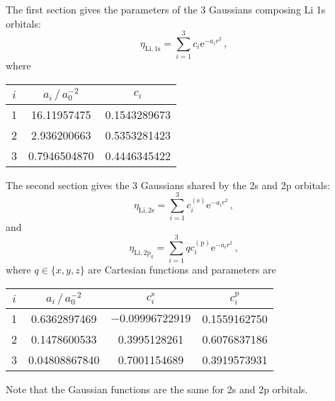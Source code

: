 \documentclass{article}
\theoremstyle{plain}\theoremheaderfont{\normalfont\itshape}\theorembodyfont{\rmfamily}\theoremseparator{.}\newtheorem*{rem}{Remark}\newtheorem*{ex}{Example}\newtheorem*{proof}{Proof}\newtheorem*{altp}{Alternative proof}
\theoremstyle{plain}\theoremheaderfont{\normalfont\bfseries}\theorembodyfont{\rmfamily}\theoremseparator{.}\newtheorem{thm}{Theorem}[section]\newtheorem{lem}[thm]{Lemma}\newtheorem{prop}[thm]{Proposition}\newtheorem*{cor}{Corollary}\newtheorem{defn}[thm]{Definition}\newtheorem{clm}[thm]{Claim}\newtheorem{clminproof}{Claim}
\theoremstyle{break}\theoremheaderfont{\normalfont\itshape}\theorembodyfont{\rmfamily}\theoremseparator{.\medskip}\newtheorem*{proofskip}{Proof}\newtheorem*{exs}{Examples}\newtheorem*{rems}{Remarks}
\theoremstyle{break}\theoremheaderfont{\normalfont\bfseries}\theorembodyfont{\rmfamily}\theoremseparator{.\medskip}\newtheorem{lemskip}[thm]{Lemma}\newtheorem{defnskip}[thm]{Definition}\newtheorem{propskip}[thm]{Proposition}\newtheorem{thmskip}[thm]{Theorem}
\numberwithin{equation}{section}
\newcommand{\e}{\mathrm{e}}
\begin{document}
\begin{itemize}[topsep=0pt,parsep=1em]
        The first section gives the parameters of the 3 Gaussians composing Li 1s orbitals:
        \begin{equation}
            \eta_{\mathrm{Li, 1s}}=\sum_{i=1}^{3} c_i \e^{-a_i r^2}\,,
        \end{equation}
        where
        \begin{table}[ht!]
            \centering
            \begin{tabular}{ccc}
                \toprule
                \(i\) & \(a_i\,/\, a_0^{-2}\) & \(c_i\) \\ \midrule
                1 & 16.11957475 & 0.1543289673 \\
                2 & 2.936200663 & 0.5353281423 \\
                3 & 0.7946504870 & 0.4446345422 \\ \bottomrule
            \end{tabular}
        \end{table}

        The second section gives the 3 Gaussians shared by the 2s and 2p orbitals:
        \begin{equation}
            \eta_{\mathrm{Li, 2s}}=\sum_{i=1}^{3} c_i^{(\mathrm{s})} \e^{-a_i r^2}\,,
        \end{equation}
        and
        \begin{equation}
            \eta_{\mathrm{Li}, 2\mathrm{p}_q}=\sum_{i=1}^{3} q c_i^{(\mathrm{p})} \e^{-a_i r^2}\,,
        \end{equation}
        where \(q\in\{x,y,z\}\) are Cartesian functions and parameters are
        \begin{table}[ht!]
            \centering
            \begin{tabular}{cccc}
                \toprule
                \(i\) & \(a_i\,/\, a_0^{-2}\) & \(c_i^{\mathrm{s}}\) & \(c_i^{\mathrm{p}}\) \\ \midrule
                1 & 0.6362897469 & \(-0.09996722919\) & 0.1559162750 \\
                2 & 0.1478600533 & 0.3995128261 & 0.6076837186 \\
                3 & 0.04808867840 & 0.7001154689 & 0.3919573931 \\ \bottomrule
            \end{tabular}
        \end{table}

        Note that the Gaussian functions are the same for 2s and 2p orbitals.


\end{itemize}
\end{document}
